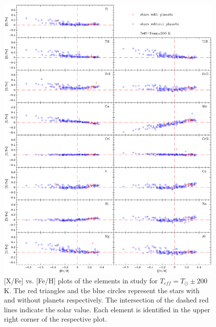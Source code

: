 \documentclass[dvips,12pt,a4paper]{report}
\begin{document}
{{\begin{figure}[h!]
\centering
\includegraphics[trim=0cm 2cm 0cm 1cm,clip,width=16 cm]{pics/parte4/xfefehfinal/xfefehtsolfinal.eps}
\caption[abundance gfx for solar temperatures]{[X/Fe] vs. [Fe/H] plots of the elements in study for $T_{eff}=T_\odot\pm$200 K. The red triangles and the blue circles represent the stars with and without planets respectively. The intersection of the dashed red lines indicate the solar value. Each element is identified in the upper right corner of the respective plot.}
\label{xfefeh2}
\end{figure}

}}
\end{document}
